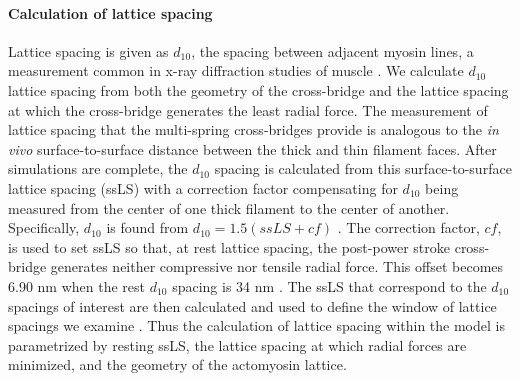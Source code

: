 \documentclass[10pt]{article}
\newcommand{\citep}[1]{\cite{#1}} %
\begin{document}


\paragraph{Calculation of lattice spacing} %
Lattice spacing is given as $d_{10}$, the spacing between adjacent myosin lines, a measurement common in x-ray diffraction studies of muscle \citep{Millman1998}.
We calculate $d_{10}$ lattice spacing from both the geometry of the cross-bridge and the lattice spacing at which the cross-bridge generates the least radial force. 
The measurement of lattice spacing that the multi-spring cross-bridges provide is analogous to the \emph{in vivo} surface-to-surface distance between the thick and thin filament faces.
After simulations are complete, the $d_{10}$ spacing is calculated from this surface-to-surface lattice spacing (ssLS) with a correction factor compensating for $d_{10}$ being measured from the center of one thick filament to the center of another. 
Specifically, $d_{10}$ is found from $d_{10} = 1.5 (ssLS + cf)$ \citep{Millman1998}. 
The correction factor, $cf$, is used to set ssLS so that, at rest lattice spacing, the post-power stroke cross-bridge generates neither compressive nor tensile radial force.  
This offset becomes 6.90 nm when the rest $d_{10}$ spacing is 34 nm \citep{Brenner1991}. 
The ssLS that correspond to the $d_{10}$ spacings of interest are then calculated and used to define the window of lattice spacings we examine \citep{Millman1998}. 
Thus the calculation of lattice spacing within the model is parametrized by resting ssLS, the lattice spacing at which radial forces are minimized, and the geometry of the actomyosin lattice. 
\end{document}

